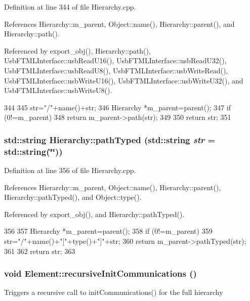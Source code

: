 Definition at line 344 of file Hierarchy.cpp.

References Hierarchy::m\_\-parent, Object::name(), Hierarchy::parent(), and Hierarchy::path().

Referenced by export\_\-obj(), Hierarchy::path(), UsbFTMLInterface::usbReadU16(), UsbFTMLInterface::usbReadU32(), UsbFTMLInterface::usbReadU8(), UsbFTMLInterface::usbWriteRead(), UsbFTMLInterface::usbWriteU16(), UsbFTMLInterface::usbWriteU32(), and UsbFTMLInterface::usbWriteU8().


\begin{DoxyCode}
344                                       {
345   str="/"+name()+str;
346   Hierarchy *m_parent=parent();
347   if (0!=m_parent){
348     return m_parent->path(str);
349   }
350   return str;
351 }
\end{DoxyCode}
\hypertarget{classHierarchy_a1efd56cd164d328d2002e53a10a19b8c}{
\subsubsection[{pathTyped}]{\setlength{\rightskip}{0pt plus 5cm}std::string Hierarchy::pathTyped (std::string {\em str} = {\ttfamily std::string(\char`\"{}\char`\"{})})}}
\label{classHierarchy_a1efd56cd164d328d2002e53a10a19b8c}


Definition at line 356 of file Hierarchy.cpp.

References Hierarchy::m\_\-parent, Object::name(), Hierarchy::parent(), Hierarchy::pathTyped(), and Object::type().

Referenced by export\_\-obj(), and Hierarchy::pathTyped().


\begin{DoxyCode}
356                                            {
357   Hierarchy *m_parent=parent();
358   if (0!=m_parent){
359     str="/"+name()+"["+type()+"]"+str;
360     return m_parent->pathTyped(str);
361   }
362   return str;
363 }
\end{DoxyCode}
\hypertarget{classElement_a82119ed37dff76508a2746a853ec35ba}{
\subsubsection[{recursiveInitCommunications}]{\setlength{\rightskip}{0pt plus 5cm}void Element::recursiveInitCommunications ()}}
\label{classElement_a82119ed37dff76508a2746a853ec35ba}
Triggers a recursive call to initCommunications() for the full hierarchy

